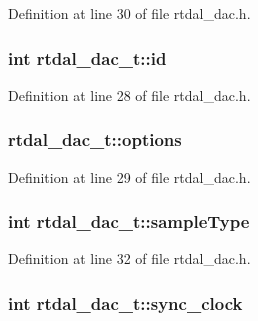 Definition at line 30 of file rtdal\-\_\-dac.\-h.

\hypertarget{structrtdal__dac__t_aa45909405d029611621f81816652122f}{
\subsubsection[{id}]{\setlength{\rightskip}{0pt plus 5cm}int rtdal\-\_\-dac\-\_\-t\-::id}}\label{structrtdal__dac__t_aa45909405d029611621f81816652122f}


Definition at line 28 of file rtdal\-\_\-dac.\-h.

\hypertarget{structrtdal__dac__t_aa224b5d176deb00b976d486140f750e9}{
\subsubsection[{options}]{ rtdal\-\_\-dac\-\_\-t\-::options}}\label{structrtdal__dac__t_aa224b5d176deb00b976d486140f750e9}


Definition at line 29 of file rtdal\-\_\-dac.\-h.

\hypertarget{structrtdal__dac__t_a3eb33c0022d57c639dbb3e5c7b1efd57}{
\subsubsection[{sample\-Type}]{\setlength{\rightskip}{0pt plus 5cm}int rtdal\-\_\-dac\-\_\-t\-::sample\-Type}}\label{structrtdal__dac__t_a3eb33c0022d57c639dbb3e5c7b1efd57}


Definition at line 32 of file rtdal\-\_\-dac.\-h.

\hypertarget{structrtdal__dac__t_a46edf9cb34c2b8541d1979a1949d4998}{
\subsubsection[{sync\-\_\-clock}]{\setlength{\rightskip}{0pt plus 5cm}int rtdal\-\_\-dac\-\_\-t\-::sync\-\_\-clock}}\label{structrtdal__dac__t_a46edf9cb34c2b8541d1979a1949d4998}


